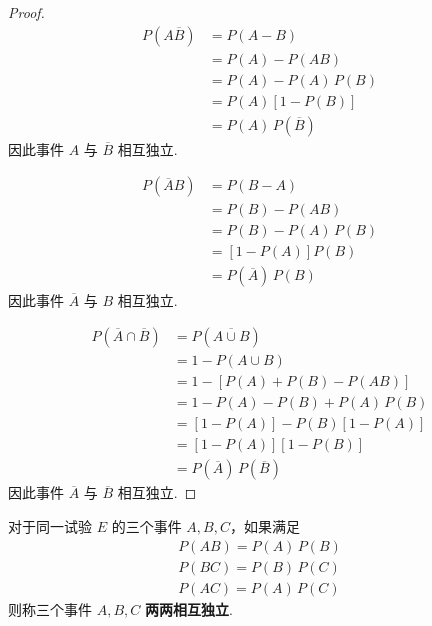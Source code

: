 \begin{proof}
    \vspace{-1em}
    $$
    \begin{aligned}
        P(A \overline{B}) &= P(A-B) \\
        &= P(A) - P(AB) \\
        &= P(A) - P(A) \, P(B)\\
        &= P(A)[1-P(B)]\\
        &= P(A) \, P(\overline{B})
    \end{aligned}
    $$
    因此事件 $A$ 与 $\overline{B}$ 相互独立.

    $$
    \begin{aligned}
        P(\overline{A} B) &= P(B-A) \\
        &= P(B) - P(AB) \\
        &= P(B) - P(A) \, P(B) \\
        &= [1-P(A)] P(B) \\
        &= P(\overline{A}) \, P(B)
    \end{aligned}
    $$
    因此事件 $\overline{A}$ 与 $B$ 相互独立.

    $$
    \begin{aligned}
        P(\overline{A} \cap \overline{B}) &= P(\overline{A \cup B}) \\
        &= 1 - P(A \cup B) \\
        &= 1 - [P(A) + P(B) - P(AB)] \\
        &= 1 - P(A) - P(B) + P(A) \, P(B) \\
        &= [1-P(A)] - P(B) [1-P(A)] \\
        &= [1-P(A)][1-P(B)] \\
        &= P(\overline{A}) \, P(\overline{B})
    \end{aligned}
    $$
    因此事件 $\overline{A}$ 与 $\overline{B}$ 相互独立.
\end{proof}

\begin{definition}
    \indent 对于同一试验 $E$ 的三个事件 $A,B,C$，如果满足
    \begin{gather*}
        P(AB) = P(A) \, P(B) \\
        P(BC) = P(B) \, P(C) \\
        P(AC) = P(A) \, P(C)
    \end{gather*}
    则称三个事件 $A,B,C$ \textbf{两两相互独立}.
\end{definition}

